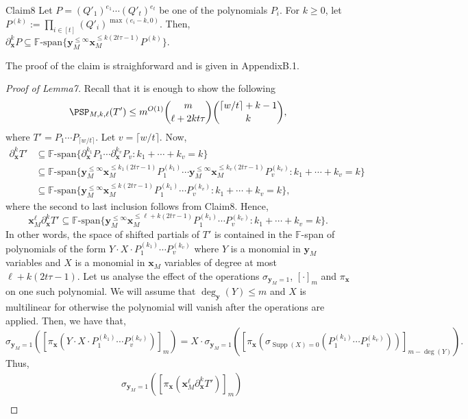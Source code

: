 \begin{authorclaim}{Claim8}
Let $P=(Q'_1)^{e_1}\cdots(Q'_t)^{e_t}$ be one of the polynomials $P_i$. For $k\ge0$, let $P^{(k)}:=\prod_{i\in[t]}(Q'_i)^{\max(e_i-k,0)}$. Then,
$\partial_{\mathbf x}^kP\subseteq\mathbb F\text{-span}\{\mathbf y_M^{\le\infty}\mathbf x_M^{\le k(2t\tau-1)}P^{(k)}\}$.
\end{authorclaim}
The proof of the claim is straighforward and is given in AppendixB.1.
\begin{proof}[Proof of Lemma7]
Recall that it is enough to show the following
\[
\PSP_{M,k,\ell}(T')\le m^{O(1)}\binom m{\ell+2kt\tau}\binom{\lceil w/t\rceil+k-1}{k},
\]
where $T'=P_1\cdots P_{\lceil w/t\rceil}$. Let $v=\lceil w/t\rceil$. Now,
\begin{align*}
\partial_{\mathbf x}^kT'
&\subseteq\mathbb F\text{-span}\{\partial_{\mathbf x}^{k_1}P_1\cdots\partial_{\mathbf x}^{k_v}P_v:k_1+\cdots+k_v=k\}\\
&\subseteq\mathbb F\text{-span}\{\mathbf y_M^{\le\infty}\mathbf x_M^{\le k_1(2t\tau-1)}P_1^{(k_1)}
\cdots\mathbf y_M^{\le\infty}\mathbf x_M^{\le k_v(2t\tau-1)}P_v^{(k_v)}:k_1+\cdots+k_v=k\}\\
&\subseteq\mathbb F\text{-span}\{\mathbf y_M^{\le\infty}\mathbf x_M^{\le k(2t\tau-1)}P_1^{(k_1)}\cdots P_v^{(k_v)}:k_1+\cdots+k_v=k\},
\end{align*}
where the second to last inclusion follows from Claim8. Hence,
\[
\mathbf x_M^\ell\partial_{\mathbf x}^kT'
\subseteq\mathbb F\text{-span}\{\mathbf y_M^{\le\infty}\mathbf x_M^{\le\ell+k(2t\tau-1)}P_1^{(k_1)}\cdots P_v^{(k_v)}:k_1+\cdots+k_v=k\}.
\]
In other words, the space of shifted partials of $T'$ is contained in the $\mathbb F$-span of polynomials of the form $Y\cdot X\cdot P_1^{(k_1)}\cdots P_v^{(k_v)}$ where $Y$ is a monomial in $\mathbf y_M$ variables and $X$ is a monomial in $\mathbf x_M$ variables of degree at most $\ell+k(2t\tau-1)$. Let us analyse the effect of the operations $\sigma_{\mathbf y_M=1}$, $[\cdot]_m$ and $\pi_{\mathbf x}$ on one such polynomial. We will assume that $\deg_{\mathbf y}(Y)\le m$ and $X$ is multilinear for otherwise the polynomial will vanish after the operations are applied. Then, we have that,
\[
\sigma_{\mathbf y_M=1}([\pi_{\mathbf x}(Y\cdot X\cdot P_1^{(k_1)}\cdots P_v^{(k_v)})]_m)
=X\cdot\sigma_{\mathbf y_M=1}([\pi_{\mathbf x}(\sigma_{\operatorname{Supp}(X)=0}(P_1^{(k_1)}\cdots P_v^{(k_v)}))]_{m-\deg(Y)}).
\]
Thus,
\begin{align*}
&\sigma_{\mathbf y_M=1}([\pi_{\mathbf x}(\mathbf x_M^\ell\partial_{\mathbf x}^kT')]_m)\\

\end{align*}
\end{proof}
